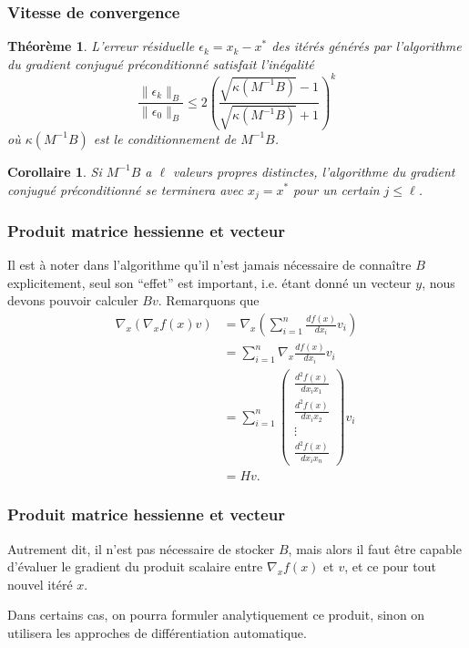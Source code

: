\documentclass[usepdftitle=false]{beamer}
\newtheorem{thm}{Théorème}
\newtheorem{coro}{Corollaire}
\begin{document}
\begin{frame}
\frametitle{Vitesse de convergence}
	
\begin{thm}
L'erreur résiduelle $\epsilon_k = x_k - x^*$ des itérés générés par l'algorithme du gradient conjugué préconditionné satisfait l'inégalité
		$$
		\frac{\| \epsilon_k \|_B}{\| \epsilon_0 \|_B}
		\leq 2\left( \frac{\sqrt{\kappa(M^{-1}B)}-1}{\sqrt{\kappa(M^{-1}B)}+1} \right)^k
		$$
		où $\kappa(M^{-1}B)$ est le conditionnement de $M^{-1}B$.
\end{thm}

\begin{coro}
Si $M^{-1}B$ a $\ell$ valeurs propres distinctes, l'algorithme du gradient conjugué préconditionné se terminera avec $x_j = x^*$ pour un certain $j \leq \ell$.
\end{coro}
	
\end{frame}

\begin{frame}
\frametitle{Produit matrice hessienne et vecteur}

Il est à noter dans l'algorithme qu'il n'est jamais nécessaire de connaître $B$ explicitement, seul son ``effet'' est important, i.e. étant donné un vecteur $y$, nous devons pouvoir calculer $Bv$.
Remarquons que
\begin{align*}
\nabla_x (\nabla_x f(x) v) &= \nabla_x \left( \sum_{i = 1}^n \frac{df(x)}{dx_i} v_i \right) \\
&= \sum_{i = 1}^n \nabla_x \frac{df(x)}{dx_i} v_i \\
&= \sum_{i = 1}^n \begin{pmatrix} \frac{d^2f(x)}{dx_ix_1} \\ \frac{d^2f(x)}{dx_ix_2} \\ \vdots \\ \frac{d^2f(x)}{dx_ix_n} \end{pmatrix} v_i \\
&= Hv.
\end{align*}
	
\end{frame}

\begin{frame}
\frametitle{Produit matrice hessienne et vecteur}

Autrement dit, il n'est pas nécessaire de stocker $B$, mais alors il faut être capable d'évaluer le gradient du produit scalaire entre $\nabla_x f(x)$ et $v$, et ce pour tout nouvel itéré $x$.

\mbox{}

Dans certains cas, on pourra formuler analytiquement ce produit, sinon on utilisera les approches de différentiation automatique.

\end{frame}
\end{document}
